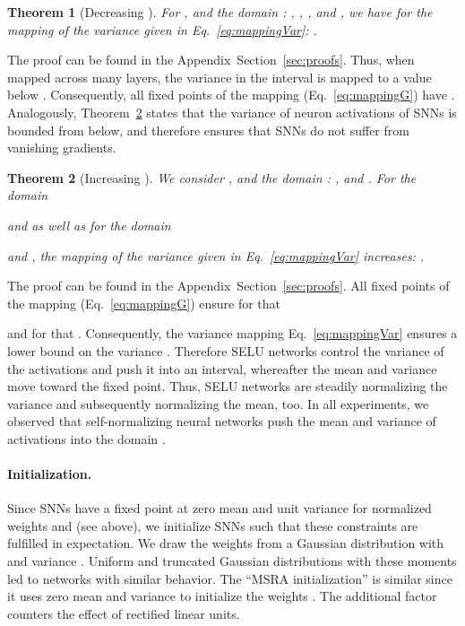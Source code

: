 \documentclass{article}
\newtheorem{theorem}{Theorem}
\begin{document}
\begin{theorem}[Decreasing ]
\label{th:varDecrease} 
For , 
and the domain :
, 
,
, and 
, 
we have for the mapping of the variance
  given in Eq.~\eqref{eq:mappingVar}:
.
\end{theorem}
The proof can be found in the Appendix~Section~\ref{sec:proofs}.
Thus, when mapped across many layers, the variance in the interval  is mapped to a value below . Consequently, all fixed
points  of the mapping  (Eq.~\eqref{eq:mappingG}) have .
Analogously, Theorem~\ref{th:s2Increase} states that the variance of neuron activations of SNNs
is bounded from below, and therefore ensures that SNNs do not suffer from vanishing gradients.
\begin{theorem}[Increasing ]
\label{th:s2Increase} 
We consider , 
and the domain : 
, and
.
For the domain 

and  as well as for the domain

and ,
the mapping of the variance
  given in Eq.~\eqref{eq:mappingVar} 
increases:
.
\end{theorem}
The proof can be found in the Appendix~Section~\ref{sec:proofs}.
All fixed
points  of the mapping  (Eq.~\eqref{eq:mappingG}) ensure for  that
 
and for  that .
Consequently, the variance mapping Eq.~\eqref{eq:mappingVar} ensures a lower bound on the variance . 
Therefore SELU networks control the variance of the activations and
push it into an interval, whereafter the mean and variance move toward
the fixed point. 
Thus, SELU networks are steadily normalizing the variance and
subsequently normalizing the mean, too. 
In all experiments, we observed that 
self-normalizing neural networks push the mean and variance of activations into the domain  .


\paragraph{Initialization.}
\label{sec:init} 
Since SNNs have a fixed point at zero mean and unit variance 
for normalized weights  and
 (see above), 
we initialize SNNs such that these
constraints are fulfilled in expectation.
We draw the weights from a Gaussian distribution 
with  and variance .
Uniform and truncated Gaussian distributions with these moments 
led to networks with similar behavior. 
The ``MSRA initialization''  is similar since 
it uses zero mean and variance  to initialize the weights \citep{bib:He2015init}.
The additional factor  counters the effect of rectified 
linear units.
\end{document}
